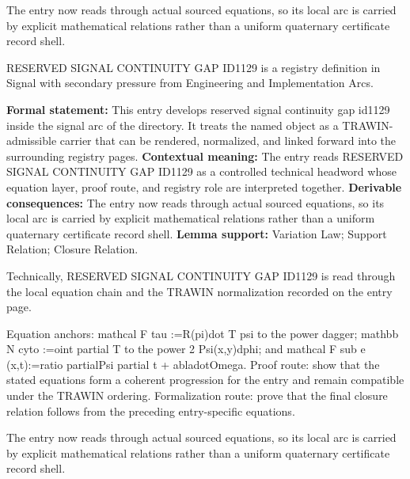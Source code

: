 The entry now reads through actual sourced equations, so its local arc is carried by explicit mathematical relations rather than a uniform quaternary certificate record shell.
\clearpage


\begingroup\small
{}
RESERVED SIGNAL CONTINUITY GAP ID1129 is a registry definition in Signal with secondary pressure from Engineering and Implementation Arcs.

\begingroup\footnotesize\setlength{\emergencystretch}{3em}\sloppy
\textbf{Formal statement:} This entry develops reserved signal continuity gap id1129 inside the signal arc of the directory. It treats the named object as a TRAWIN-admissible carrier that can be rendered, normalized, and linked forward into the surrounding registry pages. \textbf{Contextual meaning:} The entry reads RESERVED SIGNAL CONTINUITY GAP ID1129 as a controlled technical headword whose equation layer, proof route, and registry role are interpreted together. \textbf{Derivable consequences:} The entry now reads through actual sourced equations, so its local arc is carried by explicit mathematical relations rather than a uniform quaternary certificate record shell. \textbf{Lemma support:} Variation Law; Support Relation; Closure Relation.\par
\endgroup

Technically, RESERVED SIGNAL CONTINUITY GAP ID1129 is read through the local equation chain and the TRAWIN normalization recorded on the entry page.

Equation anchors: mathcal F tau :=R(pi)dot T psi to the power dagger; mathbb N cyto :=oint partial T to the power 2 Psi(x,y)dphi; and mathcal F sub e (x,t):=ratio partialPsi partial t + abladotOmega. Proof route: show that the stated equations form a coherent progression for the entry and remain compatible under the TRAWIN ordering. Formalization route: prove that the final closure relation follows from the preceding entry-specific equations.

The entry now reads through actual sourced equations, so its local arc is carried by explicit mathematical relations rather than a uniform quaternary certificate record shell.
\endgroup

